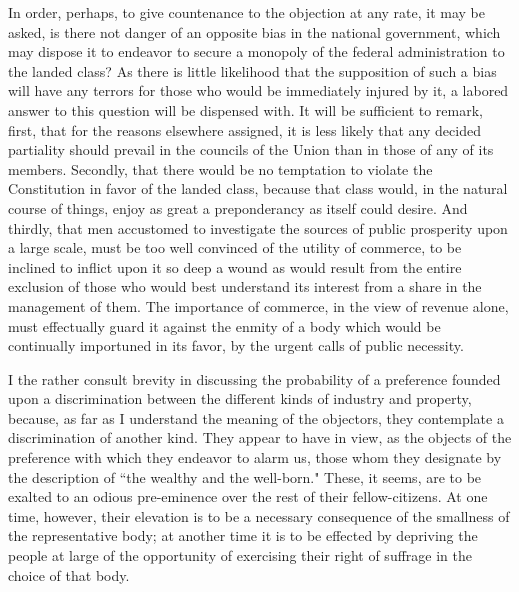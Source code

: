 In order, perhaps, to give countenance to the objection at any rate, it may be asked, is there not danger of an opposite bias in the national government, which may dispose it to endeavor to secure a monopoly of the federal administration to the landed class? As there is little likelihood that the supposition of such a bias will have any terrors for those who would be immediately injured by it, a labored answer to this question will be dispensed with. It will be sufficient to remark, first, that for the reasons elsewhere assigned, it is less likely that any decided partiality should prevail in the councils of the Union than in those of any of its members. Secondly, that there would be no temptation to violate the Constitution in favor of the landed class, because that class would, in the natural course of things, enjoy as great a preponderancy as itself could desire. And thirdly, that men accustomed to investigate the sources of public prosperity upon a large scale, must be too well convinced of the utility of commerce, to be inclined to inflict upon it so deep a wound as would result from the entire exclusion of those who would best understand its interest from a share in the management of them. The importance of commerce, in the view of revenue alone, must effectually guard it against the enmity of a body which would be continually importuned in its favor, by the urgent calls of public necessity.

I the rather consult brevity in discussing the probability of a preference founded upon a discrimination between the different kinds of industry and property, because, as far as I understand the meaning of the objectors, they contemplate a discrimination of another kind. They appear to have in view, as the objects of the preference with which they endeavor to alarm us, those whom they designate by the description of ``the wealthy and the well-born." These, it seems, are to be exalted to an odious pre-eminence over the rest of their fellow-citizens. At one time, however, their elevation is to be a necessary consequence of the smallness of the representative body; at another time it is to be effected by depriving the people at large of the opportunity of exercising their right of suffrage in the choice of that body.

